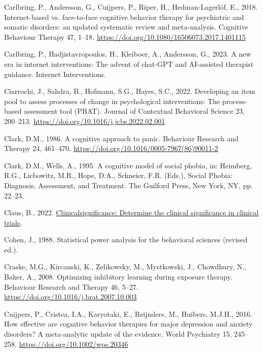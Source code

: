 \documentclass[3p]{elsarticle} %
\newlength{\cslhangindent}
\newlength{\cslentryspacingunit} %
\newenvironment{CSLReferences}[2] %
 {%
  \setlength{\parindent}{0pt}
  \ifodd #1
  \let\oldpar\par
  \def\par{\hangindent=\cslhangindent\oldpar}
  \fi
  \setlength{\parskip}{#2\cslentryspacingunit}
 }%
 {}
\begin{document}
\begin{CSLReferences}{1}{0}
\leavevmode{}%
Carlbring, P., Andersson, G., Cuijpers, P., Riper, H., Hedman-Lagerlöf,
E., 2018. {Internet-based vs. face-to-face cognitive behavior therapy
for psychiatric and somatic disorders: an updated systematic review and
meta-analysis}. Cognitive Behaviour Therapy 47, 1--18.
\url{https://doi.org/10.1080/16506073.2017.1401115}

\leavevmode{}%
Carlbring, P., Hadjistavropoulos, H., Kleiboer, A., Andersson, G., 2023.
A new era in internet interventions: The advent of chat-GPT and
AI-assisted therapist guidance. Internet Interventions.

\leavevmode{}%
Ciarrochi, J., Sahdra, B., Hofmann, S.G., Hayes, S.C., 2022. Developing
an item pool to assess processes of change in psychological
interventions: The process-based assessment tool (PBAT). Journal of
Contextual Behavioral Science 23, 200--213.
\url{https://doi.org/10.1016/j.jcbs.2022.02.001}

\leavevmode{}%
Clark, D.M., 1986. {A cognitive approach to panic}. Behaviour Research
and Therapy 24, 461--470.
\url{https://doi.org/10.1016/0005-7967(86)90011-2}

\leavevmode{}%
Clark, D.M., Wells, A., 1995. {A cognitive model of social phobia}, in:
Heimberg, R.G., Liebowitz, M.R., Hope, D.A., Schneier, F.R. (Eds.),
Social Phobia: Diagnosis, Assessment, and Treatment. The Guilford Press,
New York, NY, pp. 22--23.

\leavevmode{}%
Claus, B., 2022.
\href{https://CRAN.R-project.org/package=clinicalsignificance}{Clinicalsignificance:
Determine the clinical significance in clinical trials}.

\leavevmode{}%
Cohen, J., 1988. Statistical power analysis for the behavioral sciences
(revised ed.).

\leavevmode{}%
Craske, M.G., Kircanski, K., Zelikowsky, M., Mystkowski, J., Chowdhury,
N., Baker, A., 2008. {Optimizing inhibitory learning during exposure
therapy}. Behaviour Research and Therapy 46, 5--27.
\url{https://doi.org/10.1016/j.brat.2007.10.003}

\leavevmode{}%
Cuijpers, P., Cristea, I.A., Karyotaki, E., Reijnders, M., Huibers,
M.J.H., 2016. How effective are cognitive behavior therapies for major
depression and anxiety disorders? A meta-analytic update of the
evidence. World Psychiatry 15, 245--258.
\url{https://doi.org/10.1002/wps.20346}


\end{CSLReferences}
\end{document}
